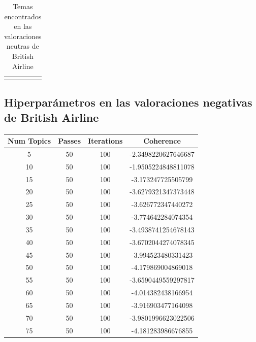 \documentclass{report}
\begin{document}
{\begin{longtable}{|p{1cm}|p{4cm}|p{4cm}|p{6cm}|}
                    \hline
                    \caption{Temas encontrados en las valoraciones neutras de British Airline}
                \end{longtable}
            \clearpage\subsection{Hiperparámetros en las valoraciones negativas de British Airline}
                \label{tab:hiperparametros_british_airline_negativas}
                \begin{longtable}{|c|c|c|c|}
                    \hline
                    \textbf{Num Topics} & \textbf{Passes} & \textbf{Iterations} & \textbf{Coherence} \\
                    \hline
                    5 & 50 & 100 & -2.3498220627646687 \\
                    \hline
                    10 & 50 & 100 & -1.9505224848811078 \\
                    \hline
                    15 & 50 & 100 & -3.173247725505799 \\
                    \hline
                    20 & 50 & 100 & -3.6279321347373448 \\
                    \hline
                    25 & 50 & 100 & -3.626772347440272 \\
                    \hline
                    30 & 50 & 100 & -3.774642284074354 \\
                    \hline
                    35 & 50 & 100 & -3.4938741254678143 \\
                    \hline
                    40 & 50 & 100 & -3.6702044274078345 \\
                    \hline
                    45 & 50 & 100 & -3.994523480331423 \\
                    \hline
                    50 & 50 & 100 & -4.179869004869018 \\
                    \hline
                    55 & 50 & 100 & -3.6590449559297817 \\
                    \hline
                    60 & 50 & 100 & -4.014382438166954 \\
                    \hline
                    65 & 50 & 100 & -3.916903477164098 \\
                    \hline
                    70 & 50 & 100 & -3.9801996623022506 \\
                    \hline
                    75 & 50 & 100 & -4.181283986676855 \\

\end{longtable}}
\end{document}
